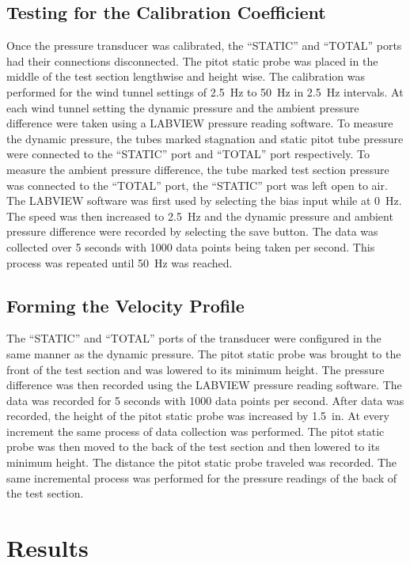 \documentclass[journal,letterpaper]{IEEEtran}
\begin{document}
\subsection{Testing for the Calibration Coefficient}

Once the pressure transducer was calibrated, the ``STATIC'' and ``TOTAL'' ports had their connections disconnected.
The pitot static probe was placed in the middle of the test section lengthwise and height wise.
The calibration was performed for the wind tunnel settings of \qty{2.5}{\hertz} to \qty{50}{\hertz} in \qty{2.5}{\hertz} intervals.
At each wind tunnel setting the dynamic pressure and the ambient pressure difference were taken using a LABVIEW pressure reading software.
To measure the dynamic pressure, the tubes marked stagnation and static pitot tube pressure were connected to the ``STATIC'' port and ``TOTAL'' port respectively.
To measure the ambient pressure difference, the tube marked test section pressure was connected to the ``TOTAL'' port, the ``STATIC'' port was left open to air.
The LABVIEW software was first used by selecting the bias input while at \qty{0}{\hertz}.
The speed was then increased to \qty{2.5}{\hertz} and the dynamic pressure and ambient pressure difference were recorded by selecting the save button.
The data was collected over 5 seconds with 1000 data points being taken per second.
This process was repeated until \qty{50}{\hertz} was reached.


\subsection{Forming the Velocity Profile}

The ``STATIC'' and ``TOTAL'' ports of the transducer were configured in the same manner as the dynamic pressure.
The pitot static probe was brought to the front of the test section and was lowered to its minimum height.
The pressure difference was then recorded using the LABVIEW pressure reading software.
The data was recorded for 5 seconds with 1000 data points per second.
After data was recorded, the height of the pitot static probe was increased by \qty{1.5}{in}.
At every increment the same process of data collection was performed.
The pitot static probe was then moved to the back of the test section and then lowered to its minimum height.
The distance the pitot static probe traveled was recorded.
The same incremental process was performed for the pressure readings of the back of the test section.


\section{Results}
\end{document}

